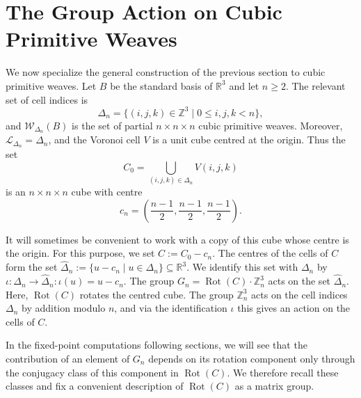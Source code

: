 \documentclass[12pt]{article}
\theoremstyle{definition}
\theoremstyle{remark}
\DeclareMathOperator{\Rot}{Rot}
\begin{document}
\section{The Group Action on Cubic Primitive Weaves}\label{section:actioncpweaves}

We now specialize the general construction of the previous section to cubic primitive weaves. Let $B$ be the standard basis of $\mathbb{R}^3$ and let $n\geq 2$. The relevant set of cell indices is
\[
\Delta_n=\{(i,j,k)\in\mathbb Z^3\mid 0\leq i,j,k<n\},
\]
and $\mathcal{W}_{\Delta_n}(B)$ is the set of partial $n\times n\times n$ cubic primitive weaves. Moreover, $\mathcal{L}_{\Delta_n}=\Delta_n$, and the Voronoi cell $V$ is a unit cube centred at the origin. Thus the set
\[
C_0=\bigcup_{(i,j,k)\in \Delta_n}V(i,j,k)
\]
is an $n\times n\times n$ cube with centre
\[
c_n=\left(\frac{n-1}{2},\frac{n-1}{2},\frac{n-1}{2}\right).
\]

It will sometimes be convenient to work with a copy of this cube whose centre is the origin. For this purpose, we set
$C:=C_0-c_n.$
The centres of the cells of $C$ form the set
$
\widehat{\Delta}_n:=\{u-c_n\mid u\in\Delta_n\}\subseteq\mathbb R^3.
$
We identify this set with $\Delta_n$ by
$\iota:\Delta_n\to\widehat{\Delta}_n:\iota(u)=u-c_n.$
The group
$G_n=\Rot(C)\cdot \mathbb{Z}_n^3$
acts on the set $\widehat{\Delta}_n$. Here, $\Rot(C)$ rotates the centred cube. The group $\mathbb Z_n^3$ acts on the cell indices $\Delta_n$ by addition modulo $n$, and via the identification $\iota$ this gives an action on the cells of $C$.


In the fixed-point computations following sections, we will see that the contribution of an element of $G_n$ depends on its rotation component only through the conjugacy class of this component in $\Rot(C)$. We therefore recall these classes and fix a convenient description of $\Rot(C)$ as a matrix group.
\end{document}
